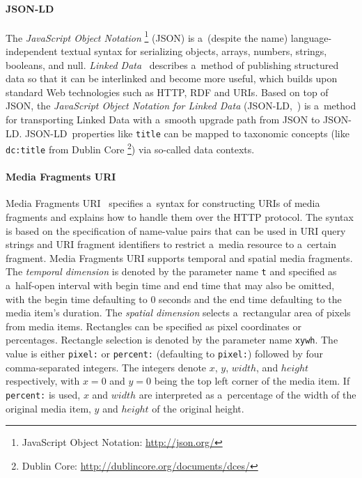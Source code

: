 \documentclass{sig-alternate}
\newcommand{\inlinelistingsize}{\fontsize{8pt}{11pt}}
\let\oldurl\url
\renewcommand{\url}[1]{\inlinelistingsize\oldurl{#1}}
\def\JSONLD{\mbox{JSON-LD}}
\begin{document}
\paragraph{\JSONLD}

The \emph{JavaScript Object Notation}%
\footnote{JavaScript Object Notation: \url{http://json.org/}}
(JSON)
is a~(despite the name) language-independent textual syntax
for serializing objects, arrays, numbers, strings, booleans, and null.
\emph{Linked Data}~\cite{bizer2009linkeddata}
describes a~method of publishing structured data
so that it can be interlinked and become more useful,
which builds upon standard Web technologies such as HTTP, RDF and URIs.
Based on top of JSON, the
\emph{JavaScript Object Notation for Linked Data}
(\JSONLD,~\cite{sporny2013jsonld}) is a~method for transporting
Linked Data with a~smooth upgrade path from JSON to \JSONLD.
\JSONLD~properties like \texttt{title} can be mapped to taxonomic
concepts (like \texttt{dc:title} from Dublin Core%
\footnote{Dublin Core: \url{http://dublincore.org/documents/dces/}})
via so-called data contexts.

\paragraph{Media Fragments URI}

Media Fragments URI~\cite{troncy2012mediafragments}
specifies a~syntax for constructing URIs of media fragments
and explains how to handle them over the HTTP protocol.
The syntax is based on the specification of
name-value pairs that can be used in URI query strings
and URI fragment identifiers to restrict a~media resource
to a~certain fragment.
Media Fragments URI supports temporal and spatial media fragments.
The \emph{temporal dimension} is denoted
by the parameter name \texttt{t} and specified
as a~half-open interval with begin time and end time
that may also be omitted,
with the begin time defaulting to 0 seconds
and the end time defaulting to the media item's duration.
The \emph{spatial dimension} selects
a~rectangular area of pixels from media items.
Rectangles can be specified as pixel coordinates or percentages.
Rectangle selection is denoted by the parameter name \texttt{xywh}.
The value is either \texttt{pixel:} or \texttt{percent:}
(defaulting to \texttt{pixel:})
followed by four comma-separated integers.
The integers denote $x$, $y$, $width$, and $height$ respectively,
with $x = 0$ and $y = 0$ being the top left corner of the media item.
If \texttt{percent:} is used, $x$ and $width$ are interpreted
as a~percentage of the width of the original media item,
$y$ and $height$
of the original height.
\end{document}
